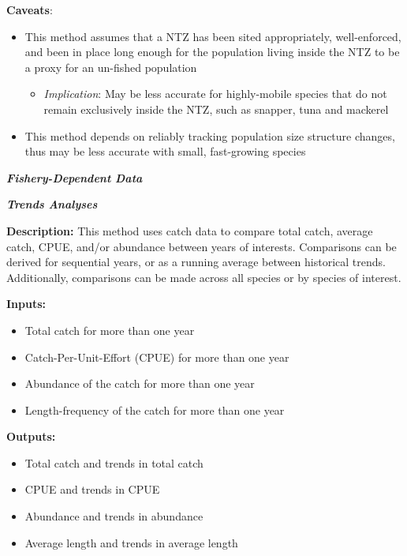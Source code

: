 \documentclass[]{book}
\providecommand{\tightlist}{%
  \setlength{\itemsep}{0pt}\setlength{\parskip}{0pt}}
\begin{document}
\textbf{Caveats}:

\begin{itemize}
\item
  This method assumes that a NTZ has been sited appropriately,
  well-enforced, and been in place long enough for the population living
  inside the NTZ to be a proxy for an un-fished population

  \begin{itemize}
  \tightlist
  \item
    \emph{Implication}: May be less accurate for highly-mobile species
    that do not remain exclusively inside the NTZ, such as snapper, tuna
    and mackerel
  \end{itemize}
\item
  This method depends on reliably tracking population size structure
  changes, thus may be less accurate with small, fast-growing species
\end{itemize}

\textbf{\emph{Fishery-Dependent Data}}

\textbf{\emph{Trends Analyses}}

\textbf{Description:} This method uses catch data to compare total
catch, average catch, CPUE, and/or abundance between years of interests.
Comparisons can be derived for sequential years, or as a running average
between historical trends. Additionally, comparisons can be made across
all species or by species of interest.

\textbf{Inputs:}

\begin{itemize}
\item
  Total catch for more than one year
\item
  Catch-Per-Unit-Effort (CPUE) for more than one year
\item
  Abundance of the catch for more than one year
\item
  Length-frequency of the catch for more than one year
\end{itemize}

\textbf{Outputs:}

\begin{itemize}
\item
  Total catch and trends in total catch
\item
  CPUE and trends in CPUE
\item
  Abundance and trends in abundance
\item
  Average length and trends in average length
\end{itemize}
\end{document}
